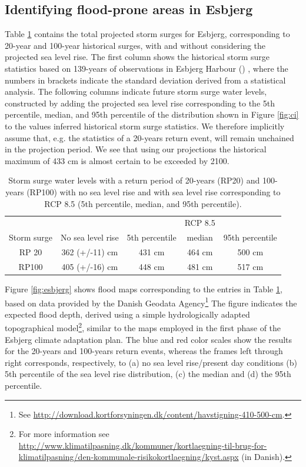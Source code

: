 \documentclass[note,screen,british,11pt]{nrdoc}
\begin{document}
\subsection{Identifying flood-prone areas in Esbjerg}
Table \ref{tab:stormsurge} contains the total projected storm surges for Esbjerg, corresponding to 20-year and 100-year historical surges, with and without considering the projected sea level rise. The first column shows the historical storm surge statistics based on 139-years of observations in Esbjerg Harbour (\citep{sealevel2012}) , where the numbers in brackets indicate the standard deviation derived from a statistical analysis. The following columns indicate future storm surge water levels, constructed by adding the projected sea level rise corresponding to the 5th percentile, median, and 95th percentile of the distribution shown in Figure \ref{fig:ci} to the values inferred historical storm surge statistics. We therefore implicitly assume that, e.g. the statistics of a 20-years return event, will remain unchained in the projection period.  We see that using our projections the historical maximum of 433 cm is almost certain to be exceeded by 2100.

\begin{table}

\begin{center}
\begin{tabular}[]{c | c | c c c}

&&&RCP 8.5&\\
Storm surge&No sea level rise&5th percentile&median&95th percentile\\
\hline
RP 20&362 (+/-11) cm&431 cm&464 cm& 500 cm\\
RP100&405 (+/-16) cm&448 cm& 481 cm& 517 cm\\
\hline
\end{tabular}
\end{center}
\caption{Storm surge water levels \citep{sealevel2012} with a return period of 20-years (RP20) and 100-years (RP100) with no sea level rise  and with sea level rise corresponding to RCP 8.5 (5th percentile, median, and 95th percentile).}
\label{tab:stormsurge}
\end{table} 

Figure \ref{fig:esbjerg} shows flood maps corresponding to the entries in Table \ref{tab:stormsurge}, based on data provided by the Danish Geodata Agency\footnote{See \url{http://download.kortforsyningen.dk/content/havstigning-410-500-cm}.} The figure indicates the expected flood depth, derived using a simple hydrologically adapted topographical model\footnote{For more information see \url{http://www.klimatilpasning.dk/kommuner/kortlaegning-til-brug-for-klimatilpasning/den-kommunale-risikokortlaegning/kyst.aspx} (in Danish).}, similar to the maps employed in the first phase of the Esbjerg climate adaptation plan. The blue and red color scales show the results for the 20-years and 100-years return events, whereas the frames left through right corresponds, respectively, to (a) no sea level rise/present day conditions (b) 5th percentile of the sea level rise distribution, (c) the median and (d) the 95th percentile.
\end{document}
